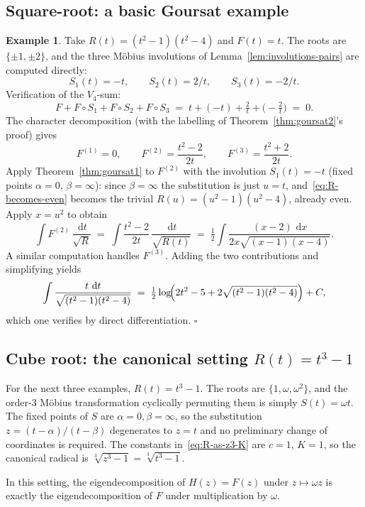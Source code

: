 \documentclass[11pt,a4paper]{article}
\theoremstyle{plain}
\theoremstyle{definition}
\newtheorem{example}[theorem]{Example}
\theoremstyle{remark}
\renewcommand{\d}{\,\mathrm{d}}
\begin{document}
\subsection{Square-root: a basic Goursat example}

\begin{example}\label{ex:goursat-basic}
Take $R(t) = (t^2-1)(t^2-4)$ and $F(t)=t$. The roots are $\{\pm 1, \pm 2\}$, and the three M\"obius involutions of Lemma~\ref{lem:involutions-pairs} are computed directly:
\[
  S_1(t) = -t,\qquad S_2(t) = 2/t,\qquad S_3(t) = -2/t.
\]
Verification of the $V_4$-sum:
\[
  F + F\!\circ\! S_1 + F\!\circ\! S_2 + F\!\circ\! S_3 \;=\; t + (-t) + \tfrac{2}{t} + \bigl(-\tfrac{2}{t}\bigr) \;=\; 0.
\]
The character decomposition (with the labelling of Theorem~\ref{thm:goursat2}'s proof) gives
\[
  F^{(1)} = 0,\qquad F^{(2)} = \frac{t^2-2}{2t},\qquad F^{(3)} = \frac{t^2+2}{2t}.
\]
Apply Theorem~\ref{thm:goursat1} to $F^{(2)}$ with the involution $S_1(t)=-t$ (fixed points $\alpha=0$, $\beta=\infty$): since $\beta=\infty$ the substitution is just $u=t$, and~\eqref{eq:R-becomes-even} becomes the trivial $R(u) = (u^2-1)(u^2-4)$, already even. Apply $x = u^2$ to obtain
\[
  \int F^{(2)}\,\frac{\d t}{\sqrt{R}} \;=\; \int \frac{t^2-2}{2t}\,\frac{\d t}{\sqrt{R(t)}}
  \;=\; \tfrac{1}{2}\int \frac{(x-2)\,\d x}{2x\sqrt{(x-1)(x-4)}}.
\]
A similar computation handles $F^{(3)}$. Adding the two contributions and simplifying yields
\[
  \int \frac{t\,\d t}{\sqrt{(t^2-1)(t^2-4)}} \;=\; \tfrac{1}{2}\log\!\Bigl(2t^2 - 5 + 2\sqrt{(t^2-1)(t^2-4)}\Bigr) + C,
\]
which one verifies by direct differentiation. \hfill$\square$
\end{example}

\subsection{Cube root: the canonical setting $R(t)=t^3-1$}

For the next three examples, $R(t)=t^3-1$. The roots are $\{1,\omega,\omega^2\}$, and the order-$3$ M\"obius transformation cyclically permuting them is simply $S(t) = \omega t$. The fixed points of $S$ are $\alpha=0,\beta=\infty$, so the substitution $z=(t-\alpha)/(t-\beta)$ degenerates to $z=t$ and no preliminary change of coordinates is required. The constants in~\eqref{eq:R-as-z3-K} are $c=1$, $K=1$, so the canonical radical is $\sqrt[3]{z^3-1}=\sqrt[3]{t^3-1}$.

In this setting, the eigendecomposition of $H(z)=F(z)$ under $z\mapsto\omega z$ is exactly the eigendecomposition of $F$ under multiplication by $\omega$.
\end{document}
